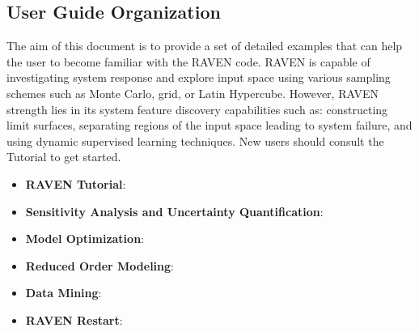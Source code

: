 \subsection{User Guide Organization}
The aim of this document is to provide a set of detailed examples that can help the user to become familiar with
the RAVEN code. RAVEN is capable of investigating system response and explore input space using various
sampling schemes such as Monte Carlo, grid, or Latin Hypercube. However, RAVEN strength lies in its system feature
discovery capabilities such as: constructing limit surfaces, separating regions of the input space leading to
system failure, and using dynamic supervised learning techniques. New users should consult the Tutorial to get started.
\begin{itemize}
  \item \textbf{RAVEN Tutorial}:
  \item \textbf{Sensitivity Analysis and Uncertainty Quantification}:
  \item \textbf{Model Optimization}:
  \item \textbf{Reduced Order Modeling}:
  \item \textbf{Data Mining}:
  \item \textbf{RAVEN Restart}:
\end{itemize}



